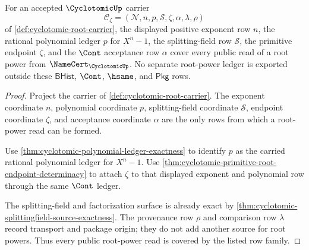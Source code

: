 \begin{theorem}
\label{thm:cyclotomic-root-power-ledger-coverage}
For an accepted $\CyclotomicUp$ carrier
$$
\mathcal{C}_{\zeta}=(\mathcal{N},n,p,\mathcal{S},\zeta,\alpha,\lambda,\rho)
$$
of \autoref{def:cyclotomic-root-carrier}, the displayed positive exponent row
$n$, the rational polynomial ledger $p$ for $X^n-1$, the splitting-field row
$\mathcal{S}$, the primitive endpoint $\zeta$, and the $\Cont$ acceptance row
$\alpha$ cover every public read of a root power from
$\NameCert_{\CyclotomicUp}$. No separate root-power ledger is exported outside
these $\mathsf{BHist}$, $\Cont$, $\hsame$, and $\mathsf{Pkg}$ rows.
\end{theorem}
\begin{proof}
Project the carrier of \autoref{def:cyclotomic-root-carrier}. The exponent
coordinate $n$, polynomial coordinate $p$, splitting-field coordinate
$\mathcal{S}$, endpoint coordinate $\zeta$, and acceptance coordinate
$\alpha$ are the only rows from which a root-power read can be formed.

Use \autoref{thm:cyclotomic-polynomial-ledger-exactness} to identify $p$ as
the carried rational polynomial ledger for $X^n-1$. Use
\autoref{thm:cyclotomic-primitive-root-endpoint-determinacy} to attach
$\zeta$ to that displayed exponent and polynomial row through the same
$\Cont$ ledger.

The splitting-field and factorization surface is already exact by
\autoref{thm:cyclotomic-splittingfield-source-exactness}. The provenance row
$\rho$ and comparison row $\lambda$ record transport and package origin; they
do not add another source for root powers. Thus every public root-power read
is covered by the listed row family.
\end{proof}

